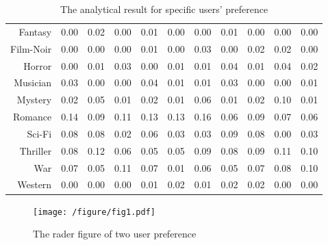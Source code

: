 \begin{table}
\begin{tabular}{rrrrrrrrrrr}
   Fantasy &      0.00  &      0.02  &      0.00  &      0.01  &      0.00  &      0.00  &      0.01  &      0.00  &      0.00  &      0.00  \\

 Film-Noir &      0.00  &      0.00  &      0.00  &      0.01  &      0.00  &      0.03  &      0.00  &      0.02  &      0.02  &      0.00  \\

    Horror &      0.00  &      0.01  &      0.03  &      0.00  &      0.01  &      0.01  &      0.04  &      0.01  &      0.04  &      0.02  \\

  Musician &      0.03  &      0.00  &      0.00  &      0.04  &      0.01  &      0.01  &      0.03  &      0.00  &      0.00  &      0.01  \\

   Mystery &      0.02  &      0.05  &      0.01  &      0.02  &      0.01  &      0.06  &      0.01  &      0.02  &      0.10  &      0.01  \\

   Romance &      0.14  &      0.09  &      0.11  &      0.13  &      0.13  &      0.16  &      0.06  &      0.09  &      0.07  &      0.06  \\

    Sci-Fi &      0.08  &      0.08  &      0.02  &      0.06  &      0.03  &      0.03  &      0.09  &      0.08  &      0.00  &      0.03  \\

  Thriller &      0.08  &      0.12  &      0.06  &      0.05  &      0.05  &      0.09  &      0.08  &      0.09  &      0.11  &      0.10  \\

       War &      0.07  &      0.05  &      0.11  &      0.07  &      0.01  &      0.06  &      0.05  &      0.07  &      0.08  &      0.10  \\

   Western &      0.00  &      0.00  &      0.00  &      0.01  &      0.02  &      0.01  &      0.02  &      0.02  &      0.00  &      0.00  \\

\end{tabular}
\caption{The analytical result for specific users' preference}  
\end{table}
\begin{figure}[htbp]
\centering
\texttt{[image: /figure/fig1.pdf]}
\caption{The rader figure of two user preference} \label{fig:1}
\end{figure}

